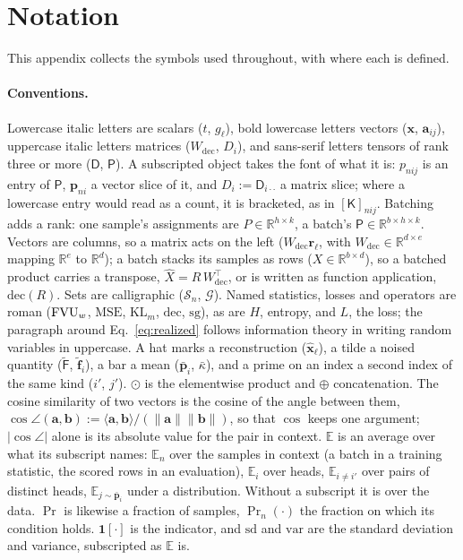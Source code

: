 \appendix

\section{Notation}
\label{app:notation}

This appendix collects the symbols used throughout, with where each is
defined.

\paragraph{Conventions.}
Lowercase italic letters are scalars ($t$, $g_\ell$), bold lowercase
letters vectors ($\mathbf{x}$, $\mathbf{a}_{ij}$), uppercase italic
letters matrices ($W_{\mathrm{dec}}$, $D_i$), and sans-serif letters
tensors of rank three or more ($\mathsf{D}$, $\mathsf{P}$). A subscripted
object takes the font of what it is: $p_{nij}$ is an entry of
$\mathsf{P}$, $\mathbf{p}_{ni}$ a vector slice of it, and
$D_i := \mathsf{D}_{i\cdot\cdot}$ a matrix slice; where a lowercase entry
would read as a count, it is bracketed, as in $[\mathsf{K}]_{nij}$.
Batching adds a rank: one sample's assignments are
$P \in \mathbb{R}^{h\times k}$, a batch's
$\mathsf{P} \in \mathbb{R}^{b\times h\times k}$. Vectors are columns, so a
matrix acts on the left ($W_{\mathrm{dec}}\mathbf{r}_\ell$, with
$W_{\mathrm{dec}} \in \mathbb{R}^{d\times e}$ mapping $\mathbb{R}^e$ to
$\mathbb{R}^d$); a batch stacks its samples as rows
($X \in \mathbb{R}^{b\times d}$), so a batched product carries a
transpose, $\hat{X} = R\,W_{\mathrm{dec}}^\top$, or is written as function
application, $\mathrm{dec}(R)$. Sets are calligraphic
($\mathcal{S}_n$, $\mathcal{G}$). Named statistics, losses and operators
are roman ($\mathrm{FVU}_w$, $\mathrm{MSE}$, $\mathrm{KL}_m$, $\mathrm{dec}$,
$\mathrm{sg}$), as are $H$, entropy, and $L$, the loss; the paragraph
around Eq.~\eqref{eq:realized} follows information theory in writing
random variables in uppercase. A hat marks a reconstruction
($\hat{\mathbf{x}}_\ell$), a tilde a noised quantity
($\tilde{\mathsf{F}}$, $\tilde{\mathbf{f}}_i$), a bar a mean
($\bar{\mathbf{p}}_i$, $\bar\kappa$), and a prime on an index a second
index of the same kind ($i'$, $j'$). $\odot$ is the elementwise product
and $\oplus$ concatenation. The cosine similarity of two vectors is the
cosine of the angle between them,
$\cos\angle(\mathbf{a}, \mathbf{b}) :=
\langle\mathbf{a},\mathbf{b}\rangle / (\lVert\mathbf{a}\rVert\lVert\mathbf{b}\rVert)$,
so that $\cos$ keeps one argument; $\lvert\cos\angle\rvert$ alone is its
absolute value for the pair in context. $\mathbb{E}$ is an average over
what its subscript names: $\mathbb{E}_n$ over the samples in context (a
batch in a training statistic, the scored rows in an evaluation),
$\mathbb{E}_i$ over heads, $\mathbb{E}_{i \neq i'}$ over pairs of distinct
heads, $\mathbb{E}_{j \sim \bar{\mathbf{p}}_i}$ under a distribution.
Without a subscript it is over the data. $\Pr$ is likewise a fraction of
samples, $\Pr_n(\cdot)$ the fraction on which its condition holds.
$\mathbf{1}[\cdot]$ is the indicator, and $\mathrm{sd}$ and $\mathrm{var}$
are the standard deviation and variance, subscripted as $\mathbb{E}$ is.

